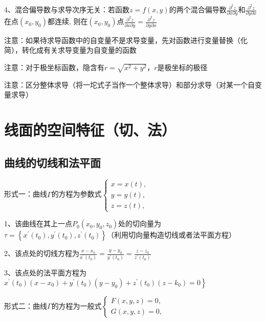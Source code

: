 4、混合偏导数与求导次序无关：若函数$z=f(x, y)$的两个混合偏导数$\frac{\partial^{2} z}{\partial x \partial y}$和$\frac{\partial^{2} z}{\partial y \partial x}$在点$\left(x_{0}, y_{0}\right)$都连续, 则在$\left(x_{0}, y_{0}\right)$点$\frac{\partial^{2} z}{\partial x \partial y}=\frac{\partial^{2} z}{\partial y \partial x}$

注意：如果待求导函数中的自变量不是求导变量，先对函数进行变量替换（化简），转化成有关求导变量为自变量的函数

注意：对于极坐标函数，隐含有$r=\sqrt{x^2+y^2}$，$r$是极坐标的极径

注意：区分整体求导（将一坨式子当作一个整体求导）和部分求导（对某一个自变量求导）

\section{线面的空间特征（切、法）}



\subsection{曲线的切线和法平面}

形式一：曲线$\Gamma$的方程为参数式$\left\{\begin{array}{l}x=x(t), \\ y=y(t),  \\ z=z(t),\end{array}\right.$

1、该曲线在其上一点$P_{0}\left(x_{0}, y_{0}, z_{0}\right)$处的切向量为$\tau=\left\{x^{\prime}\left(t_{0}\right), y^{\prime}\left(t_{0}\right), z^{\prime}\left(t_{0}\right)\right\}$（利用切向量构造切线或者法平面方程）

2、该点处的切线方程为$\frac{x-x_{0}}{x^{\prime}\left(t_{0}\right)}=\frac{y-y_{0}}{y^{\prime}\left(t_{0}\right)}=\frac{z-z_{0}}{z^{\prime}\left(t_{0}\right)}$

3、该点处的法平面方程为$\left.x^{\prime}\left(t_{0}\right)\left(x-x_{0}\right)+y^{\prime}\left(t_{0}\right)\left(y-y_{0}\right)+z^{\prime}\left(t_{0}\right)\left(z-k_{0}\right) = 0\right\}$

形式二：曲线$\Gamma$的方程为一般式$\left\{\begin{array}{l}F(x, y, z)=0,\\ G(x, y, z)=0,\end{array}\right.$

